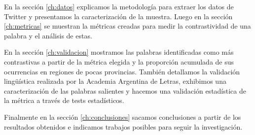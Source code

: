 En la sección \ref{ch:datos} explicamos la metodología para extraer los datos de Twitter y presentamos la caracterización de la muestra. 
Luego en la sección \ref{ch:metricas} se muestran la métricas creadas para medir la contrastividad de una palabra y el análisis de estas.

En la sección \ref{ch:validacion} mostramos las palabras identificadas como más contrastivas a partir de la métrica elegida y la proporción acumulada de sus ocurrencias en regiones de pocas provincias. 
También detallamos la validación lingüística realizada por la Academia Argentina de Letras, exhibimos una caracterización de las palabras salientes y hacemos una validación estadística de la métrica a través de tests estadísticos. 

Finalmente en la sección \ref{ch:conclusiones} sacamos conclusiones a partir de los resultados obtenidos e indicamos trabajos posibles para seguir la investigación.

